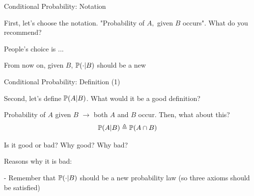 \documentclass[handout,fleqn,aspectratio=169]{beamer}
\begin{document}
\begin{frame}{Conditional Probability: Notation}

\bci

\item<1-> First, let's choose the notation. "Probability of $A,$ given $B$ occurs". What do you recommend?

\item<3-> People's choice is ... 

\item<5-> From now on, given $B$, $\mathbb{P}( \cdot | B )$ should be a new 
\eci 

\end{frame}

\begin{frame}{Conditional Probability: Definition (1)}

\plitemsep 0.1in
\bci 

\item<1-> Second, let's define $\mathbb{P}( A | B )$. What would it be a good definition?

\item<2-> Probability of $A$ given $B$ $\rightarrow$ both $A$ and $B$ occur. Then, what about this?
$$
\mathbb{P}( A | B ) \triangleq \mathbb{P}( A \cap B )
$$

\item<3-> Is it good or bad? Why good? Why bad?

\item<4-> Reasons why it is bad: 

- Remember that $\mathbb{P}( \cdot | B )$ should be a new probability law (so three axioms should be satisfied)

\medskip



\eci 

\end{frame}
\end{document}
